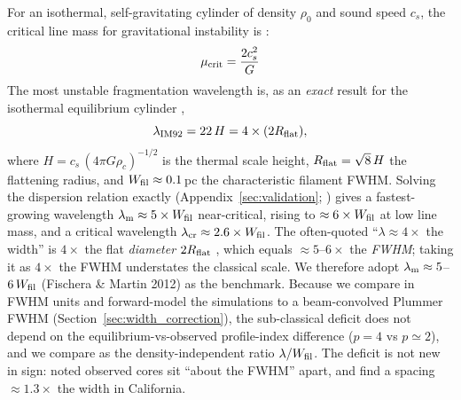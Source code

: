 \documentclass[usenatbib,twoside,twocolumn]{mnras}
\begin{document}
For an isothermal, self-gravitating cylinder of density $\rho_0$ and sound speed $c_s$, the critical line mass for gravitational instability is \citep{Ostriker1964}:
\begin{equation}
\mu_{\rm crit} = \frac{2c_s^2}{G}
\label{eq:mucrit}
\end{equation}
The most unstable fragmentation wavelength is, as an \emph{exact} result for the isothermal equilibrium cylinder \citep{Inutsuka1992},
\begin{equation}
\lambda_{\rm IM92} = 22\,H = 4\times(2R_{\rm flat}),
\label{eq:im92}
\end{equation}
where $H = c_s\,(4\pi G\rho_c)^{-1/2}$ is the thermal scale height, $R_{\rm flat}=\sqrt8\,H$ the flattening radius, and $W_{\rm fil}\approx0.1$\,pc the characteristic filament FWHM. Solving the dispersion relation exactly (Appendix~\ref{sec:validation}; \citealt{Fischera2012}) gives a fastest-growing wavelength $\lambda_{\rm m}\approx5\times W_{\rm fil}$ near-critical, rising to $\approx6\times W_{\rm fil}$ at low line mass, and a critical wavelength $\lambda_{\rm cr}\approx2.6\times W_{\rm fil}$. The often-quoted ``$\lambda\approx4\times$ the width'' is $4\times$ the flat \emph{diameter} $2R_{\rm flat}$ \citep{Inutsuka1992}, which equals $\approx5$--$6\times$ the \emph{FWHM}; taking it as $4\times$ the FWHM understates the classical scale. We therefore adopt $\lambda_{\rm m}\approx5$--$6\,W_{\rm fil}$ (Fischera \& Martin 2012) as the benchmark. Because we compare in FWHM units and forward-model the simulations to a beam-convolved Plummer FWHM (Section~\ref{sec:width_correction}), the sub-classical deficit does not depend on the equilibrium-vs-observed profile-index difference ($p=4$ vs $p\simeq2$), and we compare as the density-independent ratio $\lambda/W_{\rm fil}$. The deficit is not new in sign: \citet{Fischera2012} noted observed cores sit ``about the FWHM'' apart, and \citet{Zhang2023cal} find a spacing $\approx1.3\times$ the width in California.
\end{document}
